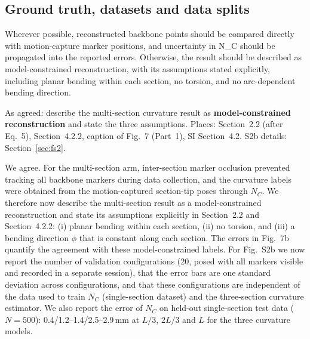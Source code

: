 \documentclass[10pt,a4paper]{article}
\begin{document}
\subsection{Ground truth, datasets and data splits}\label{sec:data}
\begin{rev}
Wherever possible, reconstructed backbone points should be compared directly with motion-capture marker positions, and uncertainty in N\_C should be propagated into the reported errors. Otherwise, the result should be described as model-constrained reconstruction, with its assumptions stated explicitly, including planar bending within each section, no torsion, and no arc-dependent bending direction.
\end{rev}
\begin{todo}
As agreed: describe the multi-section curvature result as \textbf{model-constrained reconstruction} and state the three assumptions. Places: Section~2.2 (after Eq.~5), Section~4.2.2, caption of Fig.~7 (Part~1), SI Section~4.2. S2b details: Section~\ref{sec:fs2}.
\end{todo}
\begin{resp}
We agree. For the multi-section arm, inter-section marker occlusion prevented tracking all backbone markers during data collection, and the curvature labels were obtained from the motion-captured section-tip poses through $N_C$. We therefore now describe the multi-section result as a model-constrained reconstruction and state its assumptions explicitly in Section~2.2 and Section~4.2.2: (i) planar bending within each section, (ii) no torsion, and (iii) a bending direction $\phi$ that is constant along each section. The errors in Fig.~7b quantify the agreement with these model-constrained labels. For Fig.~S2b we now report the number of validation configurations (20, posed with all markers visible and recorded in a separate session), that the error bars are one standard deviation across configurations, and that these configurations are independent of the data used to train $N_C$ (single-section dataset) and the three-section curvature estimator. We also report the error of $N_C$ on held-out single-section test data ($N=500$): 0.4/1.2--1.4/2.5--2.9\,mm at $L/3$, $2L/3$ and $L$ for the three curvature models.
\end{resp}
\end{document}
